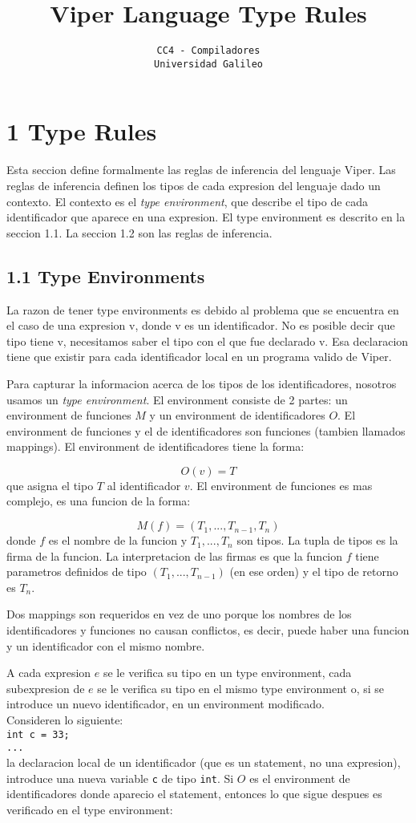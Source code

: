 \documentclass[12pt]{report}
\title{\textbf{Viper Language Type Rules}}
\author{\texttt{CC4 - Compiladores} \\ \texttt{Universidad Galileo}}
\date{}
\begin{document}
\maketitle

\section*{1 Type Rules}
Esta seccion define formalmente las reglas de inferencia del lenguaje Viper. Las reglas de inferencia definen los tipos de cada expresion del lenguaje dado un contexto. El contexto es el \textit{type environment}, que describe el tipo de cada identificador que aparece en una expresion. El type environment es descrito en la seccion 1.1. La seccion 1.2 son las reglas de inferencia.
\subsection*{1.1 Type Environments}
La razon de tener type environments es debido al problema que se encuentra en el caso de una expresion v, donde v es un identificador. No es posible decir que tipo tiene v, necesitamos saber el tipo con el que fue declarado v. Esa declaracion tiene que existir para cada identificador local en un programa valido de Viper.

Para capturar la informacion acerca de los tipos de los identificadores, nosotros usamos un \textit{type environment}. El environment consiste de 2 partes: un environment de funciones $M$ y un environment de identificadores $O$. El environment de funciones y el de identificadores son funciones (tambien llamados mappings). El environment de identificadores tiene la forma:

$$O(v) = T$$
que asigna el tipo $T$ al identificador $v$. El environment de funciones es mas complejo, es una funcion de la forma:

$$M(f) = (T_1,...,T_{n-1}, T_n)$$
donde $f$ es el nombre de la funcion y $T_1,...,T_n$ son tipos. La tupla de tipos es la firma de la funcion. La interpretacion de las firmas es que la funcion $f$ tiene parametros definidos de tipo $(T_1,...,T_{n-1})$ (en ese orden) y el tipo de retorno es $T_n$.

Dos mappings son requeridos en vez de uno porque los nombres de los identificadores y funciones no causan conflictos, es decir, puede haber una funcion y un identificador con el mismo nombre.

A cada expresion $e$ se le verifica su tipo en un type environment, cada subexpresion de $e$ se le verifica su tipo en el mismo type environment o, si se introduce un nuevo identificador, en un environment modificado. \\
Consideren lo siguiente:\\
\texttt{int c = 33;}\\
\texttt{...}\\
la declaracion local de un identificador (que es un statement, no una expresion), introduce una nueva variable \texttt{c} de tipo \texttt{int}. Si $O$ es el environment de identificadores donde aparecio el statement, entonces lo que sigue despues es verificado en el type environment:
\end{document}
